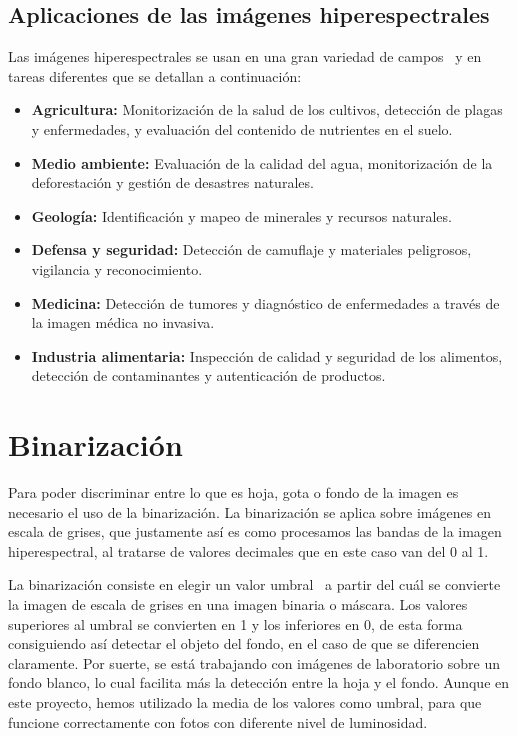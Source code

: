 \subsection{Aplicaciones de las imágenes hiperespectrales}
Las imágenes hiperespectrales se usan en una gran variedad de campos~\cite{hiperapli} y en tareas diferentes que se detallan a continuación:

\begin{itemize}
    \item \textbf{Agricultura:} Monitorización de la salud de los cultivos, detección de plagas y enfermedades, y evaluación del contenido de nutrientes en el suelo.
    \item \textbf{Medio ambiente:} Evaluación de la calidad del agua, monitorización de la deforestación y gestión de desastres naturales.
    \item \textbf{Geología:} Identificación y mapeo de minerales y recursos naturales.
    \item \textbf{Defensa y seguridad:} Detección de camuflaje y materiales peligrosos, vigilancia y reconocimiento.
    \item \textbf{Medicina:} Detección de tumores y diagnóstico de enfermedades a través de la imagen médica no invasiva.
    \item \textbf{Industria alimentaria:} Inspección de calidad y seguridad de los alimentos, detección de contaminantes y autenticación de productos.
\end{itemize}


\section{Binarización}
Para poder discriminar entre lo que es hoja, gota o fondo de la imagen es necesario el uso de la binarización. La binarización se aplica sobre imágenes en escala de grises, que justamente así es como procesamos las bandas de la imagen hiperespectral, al tratarse de valores decimales que en este caso van del 0 al 1. 

La binarización consiste en elegir un valor umbral~\cite{thresh} a partir del cuál se convierte la imagen de escala de grises en una imagen binaria o máscara. Los valores superiores al umbral se convierten en 1 y los inferiores en 0, de esta forma consiguiendo así detectar el objeto del fondo, en el caso de que se diferencien claramente. Por suerte, se está trabajando con imágenes de laboratorio sobre un fondo blanco, lo cual facilita más la detección entre la hoja y el fondo. Aunque en este proyecto, hemos utilizado la media de los valores como umbral, para que funcione correctamente con fotos con diferente nivel de luminosidad. 

